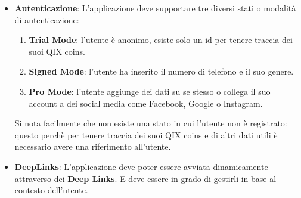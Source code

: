 \begin{itemize}
{        Tale gravità finirà con la fine dell'animazione o l'apparizione di una nuova pagina se presente.
    }
    \item {
        \textbf{Autenticazione}: L'applicazione deve supportare tre diversi stati o modalità di autenticazione:
        \begin{enumerate}
            \item\textbf{Trial Mode}: l'utente è anonimo, esiste solo un id per tenere traccia dei suoi QIX coins.
            \item\textbf{Signed Mode}: l'utente ha inserito il numero di telefono e il suo genere.
            \item \textbf{Pro Mode}: l'utente aggiunge dei dati su se stesso o collega il suo account a dei social media come Facebook, Google o Instagram.
        \end{enumerate}
        Si nota facilmente che non esiste una stato in cui l'utente non è registrato: questo perchè
        per tenere traccia dei suoi QIX coins e di altri dati utili è necessario avere una riferimento all'utente.
    }
    \item {
        \textbf{DeepLinks}: L'applicazione deve poter essere avviata dinamicamente
        attraverso dei \textbf{Deep Links}\cite{deeplinks}.
        E deve essere in grado di gestirli in base al contesto dell'utente.
    }
\end{itemize}